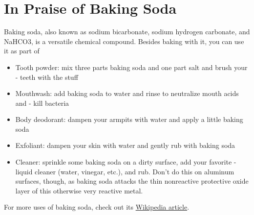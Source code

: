 \documentclass[letterpaper,10pt,english]{sphinxmanual}
\begin{document}
\chapter{In Praise of Baking Soda}
\label{baking_soda::doc}\label{baking_soda:in-praise-of-baking-soda}
Baking soda, also known as sodium bicarbonate, sodium hydrogen carbonate, and NaHCO3, is a versatile chemical compound.  Besides baking with it, you can use it as part of
\begin{itemize}
\item {} 
Tooth powder: mix three parts baking soda and one part salt and brush your - teeth with the stuff

\item {} 
Mouthwash: add baking soda to water and rinse to neutralize mouth acids and - kill bacteria

\item {} 
Body deodorant: dampen your armpits with water and apply a little baking soda

\item {} 
Exfoliant: dampen your skin with water and gently rub with baking soda

\item {} 
Cleaner: sprinkle some baking soda on a dirty surface, add your favorite - liquid cleaner (water, vinegar, etc.), and rub.  Don’t do this on aluminum surfaces, though, as baking soda attacks the thin nonreactive protective oxide layer of this otherwise very reactive metal.

\end{itemize}

For more uses of baking soda, check out its \href{http://en.wikipedia.org/wiki/Baking\_soda}{Wikipedia article}.



\renewcommand{\indexname}{Index}
\printindex
\end{document}

